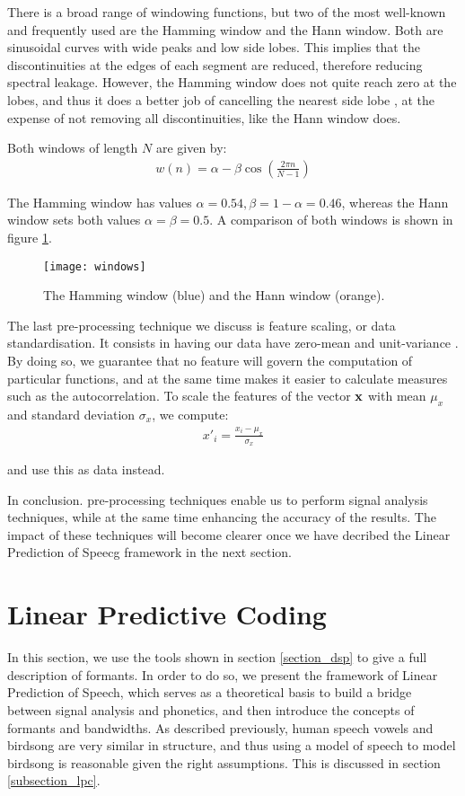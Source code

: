 \documentclass[../main.tex]{subfiles}
\begin{document}
\par There is a broad range of windowing functions, but two of the most well-known and frequently used are the Hamming window and the Hann window. Both are sinusoidal curves with wide peaks and low side lobes. This implies that the discontinuities at the edges of each segment are reduced, therefore reducing spectral leakage. However, the Hamming window does not quite reach zero at the lobes, and thus it does a better job of cancelling the nearest side lobe \cite{NationalInstruments2015}, at the expense of not removing all discontinuities, like the Hann window does.
\par Both windows of length $N$ are given by:
\begin{align*}
w(n) = \alpha - \beta \cos{(\frac{2\pi n}{N-1})}
\end{align*}
\par The Hamming window has values $\alpha = 0.54, \beta = 1 - \alpha = 0.46$, whereas the Hann window sets both values $\alpha = \beta = 0.5$. A comparison of both windows is shown in figure \ref{fig_windows}.
\begin{figure}[t]
\centering
\texttt{[image: windows]}
\caption{The Hamming window (blue) and the Hann window (orange).}
\label{fig_windows}
\end{figure}
\par The last pre-processing technique we discuss is feature scaling, or data standardisation. It consists in having our data have zero-mean and unit-variance \cite{Raschka2014}. By doing so, we guarantee that no feature will govern the computation of particular functions, and at the same time makes it easier to calculate measures such as the autocorrelation. To scale the features of the vector $\mathbf{x}$ with mean $\mu_x$ and standard deviation $\sigma_x$, we compute:
\begin{align*}
x'_i = \frac{x_i - \mu_x}{\sigma_x}
\end{align*}
\par and use this as data instead.
\par In conclusion. pre-processing techniques enable us to perform signal analysis techniques, while at the same time enhancing the accuracy of the results. The impact of these techniques will become clearer once we have decribed the Linear Prediction of Speecg framework in the next section.

\section{Linear Predictive Coding} \label{section_lpc}
In this section, we use the tools shown in section \ref{section_dsp} to give a full description of formants. In order to do so, we present the framework of Linear Prediction of Speech, which serves as a theoretical basis to build a bridge between signal analysis and phonetics, and then introduce the concepts of formants and bandwidths. As described previously, human speech vowels and birdsong are very similar in structure, and thus using a model of speech to model birdsong is reasonable given the right assumptions. This is discussed in section \ref{subsection_lpc}.
\end{document}
